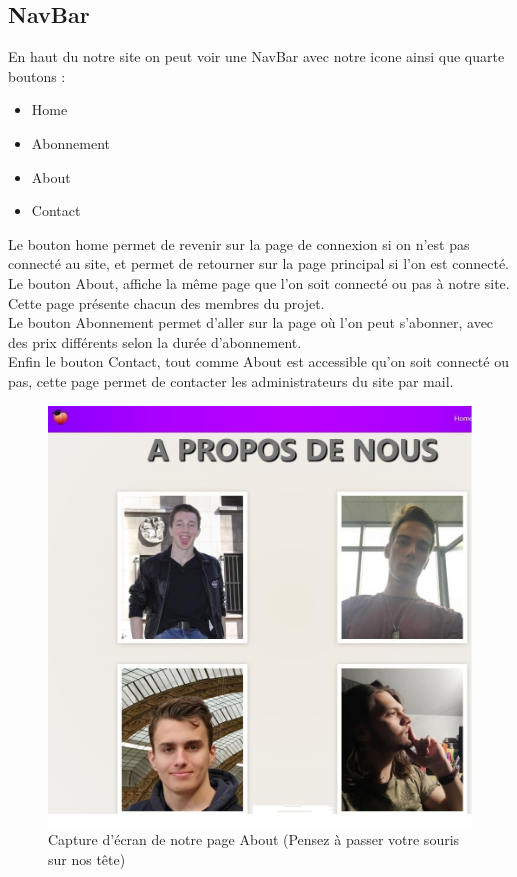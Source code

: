 \documentclass[12pt]{report}
\begin{document}
\subsection{NavBar}
	En haut du notre site on peut voir une NavBar avec notre icone ainsi que quarte boutons : \\
	\begin{itemize}
		\item Home
		\item Abonnement
		\item About 
		\item Contact
	\end{itemize}
Le bouton home permet de revenir sur la page de connexion si on n'est pas connecté au site, et permet de retourner sur la page principal si l'on est connecté.\\
Le bouton About, affiche la même page que l'on soit connecté ou pas à notre site. Cette page présente chacun des membres du projet.\\
Le bouton Abonnement permet d'aller sur la page où l'on peut s'abonner, avec des prix différents selon la durée d'abonnement.\\
Enfin le bouton Contact, tout comme About est accessible qu'on soit connecté ou pas, cette page permet de contacter les administrateurs du site par mail.
\begin{figure}[h!]
	\begin{center}
		\includegraphics[scale=0.7]{Aboutus.jpg}
	\end{center}
		\caption{Capture d'écran de notre page About (Pensez à passer votre souris sur nos tête)}
\end{figure}
\clearpage
\end{document}
